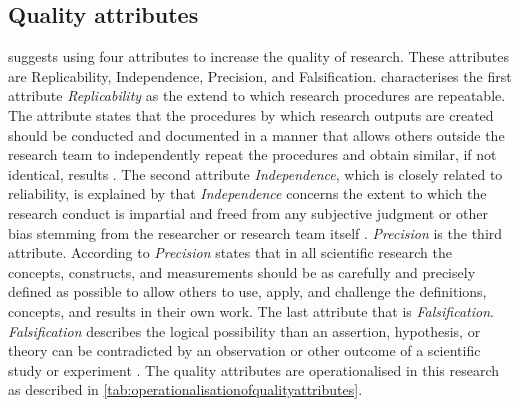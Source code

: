 \subsection{Quality attributes}
\label{sub:qualityattributes}
\textcite[p. 15-17]{Recker2012} suggests using four attributes to increase the quality of research. These attributes are Replicability, Independence, Precision, and Falsification. \textcite[p.~15]{Recker2012} characterises the first attribute \textit{Replicability} as the extend to which research procedures are repeatable. The attribute states that the procedures by which research outputs are created should be conducted and documented in a manner that allows others outside the research team to independently repeat the procedures and obtain similar, if not identical, results \parencite[p.~15]{Recker2012}. The second attribute \textit{Independence}, which is closely related to reliability, is explained by \textcite[p.~16]{Recker2012} that \textit{Independence} concerns the extent to which the research conduct is impartial and freed from any subjective judgment or other bias stemming from the researcher or research team itself \parencite[p.~16]{Recker2012}. \textit{Precision} is the third attribute. According to \textcite[p.~16]{Recker2012} \textit{Precision} states that in all scientific research the concepts, constructs, and measurements should be as carefully and precisely defined as possible to allow others to use, apply, and challenge the definitions, concepts, and results in their own work. The last attribute that is \textit{Falsification}. \textit{Falsification} describes the logical possibility than an assertion, hypothesis, or theory can be contradicted by an observation or other outcome of a scientific study or experiment \parencite[p.~16]{Recker2012}. The quality attributes are operationalised in this research as described in \cref{tab:operationalisationofqualityattributes}.
